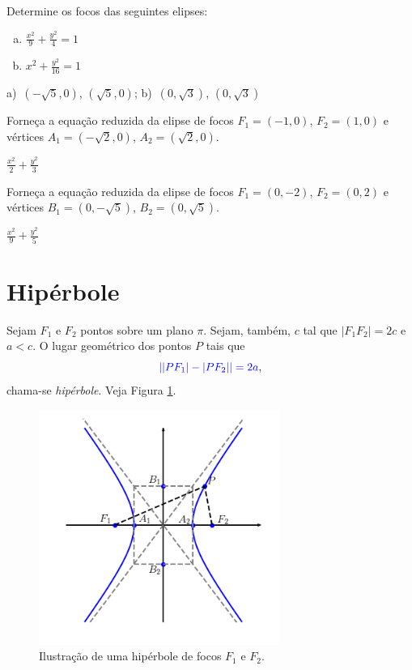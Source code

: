 \begin{exer}
  Determine os focos das seguintes elipses:
  \begin{enumerate}[a)]
  \item $\displaystyle \frac{x^2}{9} + \frac{y^2}{4} = 1$
  \item $\displaystyle x^2 + \frac{y^2}{16} = 1$
  \end{enumerate}
\end{exer}
\begin{resp}
  a)~$(-\sqrt{5}, 0)$, $(\sqrt{5}, 0)$; b)~$(0, \sqrt{3})$, $(0, \sqrt{3})$
\end{resp}

\begin{exer}
  Forneça a equação reduzida da elipse de focos $F_1=(-1, 0)$, $F_2=(1, 0)$ e vértices $A_1=(-\sqrt{2}, 0)$, $A_2=(\sqrt{2}, 0)$.
\end{exer}
\begin{resp}
  $\displaystyle\frac{x^2}{2}+\frac{y^2}{3}$
\end{resp}

\begin{exer}
  Forneça a equação reduzida da elipse de focos $F_1=(0, -2)$, $F_2=(0, 2)$ e vértices $B_1=(0, -\sqrt{5})$, $B_2=(0, \sqrt{5})$.
\end{exer}
\begin{resp}
  $\displaystyle\frac{x^2}{9}+\frac{y^2}{5}$
\end{resp}

\section{Hipérbole}\label{cap_conicas_sec_hiperbole}

Sejam $F_1$ e $F_2$ pontos sobre um plano $\pi$. Sejam, também, $c$ tal que $|F_1F_2|=2c$ e $a<c$. O lugar geométrico dos pontos $P$ tais que
\begin{equation}
  {\color{blue}||PF_1|-|PF_2||=2a},
\end{equation}
chama-se \emph{hipérbole}. Veja Figura \ref{fig:hiperbole}.

\begin{figure}[H]
  \centering
  \includegraphics[width=0.7\textwidth]{./cap_conicas/dados/fig_hiperbole/fig_hiperbole}
  \caption{Ilustração de uma hipérbole de focos $F_1$ e $F_2$.}
  \label{fig:hiperbole}
\end{figure}

